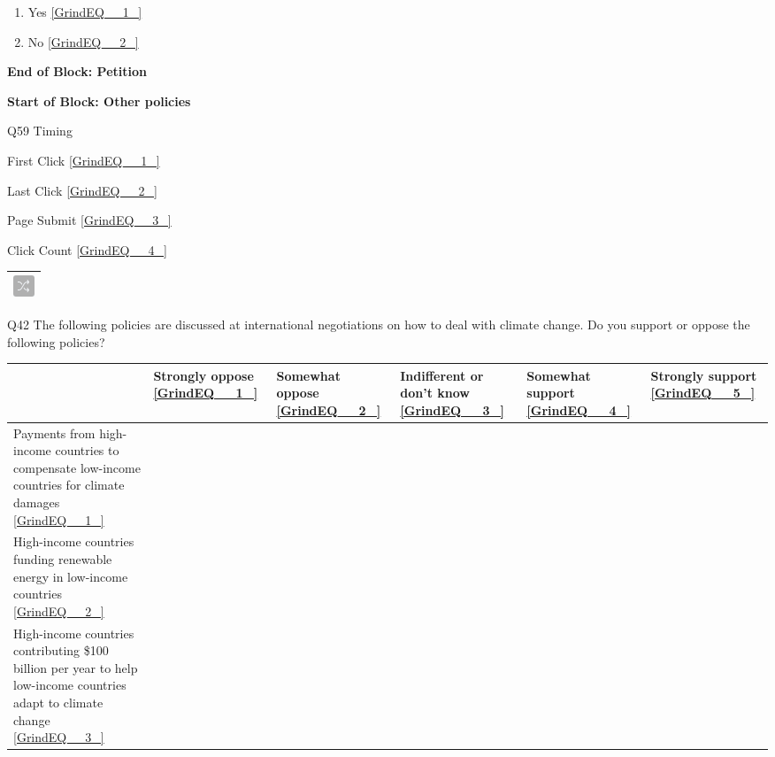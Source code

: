 \documentclass{article} %
\begin{document}
\begin{enumerate}
\item  Yes  \eqref{GrindEQ__1_} 

\item  No  \eqref{GrindEQ__2_} 
\end{enumerate}

\noindent 

\noindent \textbf{End of Block: Petition}

\noindent \textbf{}

\noindent \textbf{Start of Block: Other policies}

\noindent 

\noindent Q59 Timing

\noindent First Click  \eqref{GrindEQ__1_}

\noindent Last Click  \eqref{GrindEQ__2_}

\noindent Page Submit  \eqref{GrindEQ__3_}

\noindent Click Count  \eqref{GrindEQ__4_}

\noindent 

\noindent 

\begin{tabular}{|p{0.2in}|} \hline 
\includegraphics*[width=0.25in, height=0.25in]{image11} \\ \hline 
\end{tabular}



\noindent Q42 The following policies are discussed  at international negotiations on how to deal with climate change. Do you support or oppose the following policies?

\begin{tabular}{|p{0.7in}|p{0.7in}|p{0.7in}|p{0.7in}|p{0.7in}|p{0.7in}|} \hline 
 & Strongly oppose \eqref{GrindEQ__1_} & Somewhat oppose \eqref{GrindEQ__2_} & Indifferent or don't know \eqref{GrindEQ__3_} & Somewhat support \eqref{GrindEQ__4_} & Strongly support \eqref{GrindEQ__5_} \\ \hline 
Payments from high-income countries to compensate low-income countries for climate damages \eqref{GrindEQ__1_}  &   &   &   &   &   \\ \hline 
High-income countries funding renewable energy in low-income countries \eqref{GrindEQ__2_}  &   &   &   &   &   \\ \hline 
High-income countries contributing \$100 billion per year to help low-income countries adapt to climate change \eqref{GrindEQ__3_}  &   &   &   &   &   \\ \hline 
\end{tabular}
\end{document}
